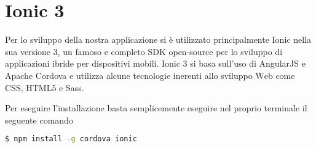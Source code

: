 \documentclass[a4paper,titlepage]{book}
\begin{document}
\section{Ionic 3}
Per lo sviluppo della nostra applicazione si \`{e} utilizzato principalmente Ionic nella sua versione 3, un famoso e completo {\foreignlanguage{english} SDK open-source} per lo sviluppo di applicazioni ibride per dispositivi mobili. 
Ionic 3 si basa sull'uso di AngularJS e Apache Cordova e utilizza alcune tecnologie inerenti allo sviluppo {\foreignlanguage{english} Web} come CSS, HTML5 e Sass.

Per eseguire l'installazione basta semplicemente eseguire nel proprio terminale il seguente comando
\begin{lstlisting}[language=bash]
  $ npm install -g cordova ionic
\end{lstlisting}

\
\end{document}

